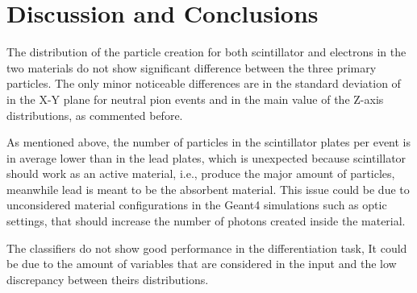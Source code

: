 \chapter{Discussion and Conclusions}

The distribution of the particle creation for both scintillator and electrons
in the two materials do not show significant difference between the three
primary particles. The only minor noticeable differences are in the standard
deviation of in the X-Y plane for neutral pion events and in the main value of
the Z-axis distributions, as commented before.

As mentioned above, the number of particles in the scintillator plates per
event is in average lower than in the lead plates, which is unexpected because
scintillator should work as an active material, i.e., produce the major amount
of particles, meanwhile lead is meant to be the absorbent
material\cite{omelaenko2000lhcb}. This issue could be due to unconsidered
material configurations in the Geant4 simulations such as optic settings, that
should increase the number of photons created inside the material.

The classifiers do not show good performance in the differentiation task, It
could be due to the amount of variables that are considered in the input and
the low discrepancy between theirs distributions.
